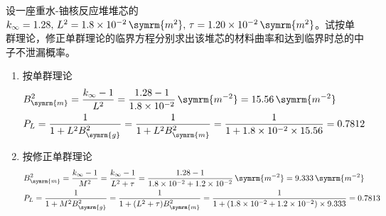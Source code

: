\begin{exercise}
    设一座重水-铀核反应堆堆芯的$k_{\infty} = 1.28,\,L^2 = 1.8\times 10^{-2}\,\symrm{m^2},\,\tau = 1.20\times 10^{-2}\,\symrm{m^2}$。试按单群理论，修正单群理论的临界方程分别求出该堆芯的材料曲率和达到临界时总的中子不泄漏概率。
    \begin{solution}
        \begin{enumerate}[(1)]
            \item 按单群理论
            \begin{align*}
                &B_{\symrm{m}}^2 = \frac{k_{\infty} - 1}{L^2} = \frac{1.28 - 1}{1.8\times 10^{-2}}\,\symrm{m^{-2}} = 15.56\,\symrm{m^{-2}} \\
                &P_L = \frac{1}{1 + L^2 B_{\symrm{g}}^2} = \frac{1}{1 + L^2 B_{\symrm{m}}^2} = \frac{1}{1 + 1.8\times 10^{-2}\times 15.56} = 0.7812
            \end{align*}
            \item 按修正单群理论
            \begin{align*}
                &B_{\symrm{m}}^2 = \frac{k_{\infty} - 1}{M^2} = \frac{k_{\infty} - 1}{L^2 + \tau} = \frac{1.28 - 1}{1.8\times 10^{-2} + 1.2\times 10^{-2}}\,\symrm{m^{-2}} = 9.333\,\symrm{m^{-2}} \\
                &P_L = \frac{1}{1 + M^2 B_{\symrm{g}}^2} = \frac{1}{1 + (L^2 + \tau) B_{\symrm{m}}^2} = \frac{1}{1 + (1.8\times 10^{-2} + 1.2\times 10^{-2})\times 9.333} = 0.7813
            \end{align*}
        \end{enumerate}
    \end{solution}
\end{exercise}

